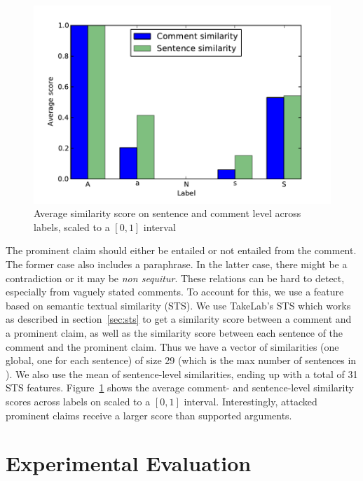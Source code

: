 \begin{figure}
\includegraphics{similarity.pdf}
\caption{Average similarity score  on sentence and comment level across
labels, scaled to a $[0,1]$ interval}
\label{fig:sts_comarg}
\end{figure}

The prominent claim should either be entailed or not entailed from the comment. 
The former case also includes a paraphrase. 
In the latter case, there might be a contradiction or it may be \textit{non sequitur}. 
These relations can be hard to detect, especially from vaguely stated comments. 
To account for this, we use a feature based on semantic textual similarity (STS). 
We use TakeLab's STS \citep{vsaric2012takelab} which works as described in
section~\ref{sec:sts} to get a similarity score between 
a comment and a prominent claim, as well as the similarity score between 
each sentence of the comment and the prominent claim. 
Thus we have a vector of similarities (one global, one for each sentence) of size
29 (which is the max number of sentences in \ComArg ). 
We also use the mean of sentence-level similarities, ending up with a total of 31 STS features. 
Figure~\ref{fig:sts_comarg} shows the average comment- and sentence-level similarity scores
across labels on \ComArg scaled to a $[0, 1]$ interval.
Interestingly, attacked prominent claims receive a larger score than supported
arguments. 

\section{Experimental Evaluation}
\label{sec:argrec_experiments}

